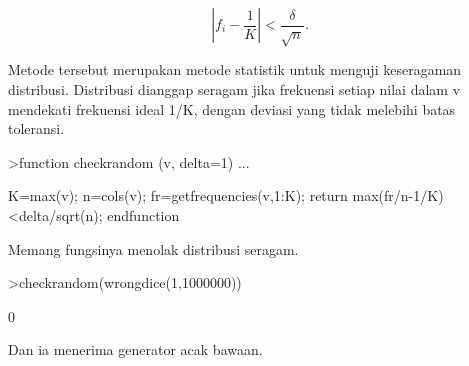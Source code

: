 \documentclass[a4paper,10pt]{article}
\begin{document}
\begin{eulernotebook}
\begin{eulercomment}
\begin{eulercomment}
\begin{eulercomment}
\end{eulercomment}
\begin{eulerformula}
\[
\left|f_i-\frac{1}{K}\right| < \frac{\delta}{\sqrt{n}}.
\]
\end{eulerformula}
\begin{eulercomment}
Metode tersebut merupakan metode statistik untuk menguji keseragaman
distribusi. Distribusi dianggap seragam jika frekuensi setiap nilai
dalam v mendekati frekuensi ideal 1/K, dengan deviasi yang tidak
melebihi batas toleransi.
\end{eulercomment}
\begin{eulerprompt}
>function checkrandom (v, delta=1) ...
\end{eulerprompt}
\begin{eulerudf}
    K=max(v); n=cols(v);
    fr=getfrequencies(v,1:K);
    return max(fr/n-1/K)<delta/sqrt(n);
    endfunction
\end{eulerudf}
\begin{eulercomment}
Memang fungsinya menolak distribusi seragam.
\end{eulercomment}
\begin{eulerprompt}
>checkrandom(wrongdice(1,1000000))
\end{eulerprompt}
\begin{euleroutput}
  0
\end{euleroutput}
\begin{eulercomment}
Dan ia menerima generator acak bawaan.


\end{eulercomment}
\end{eulercomment}
\end{eulercomment}
\end{eulernotebook}
\end{document}
